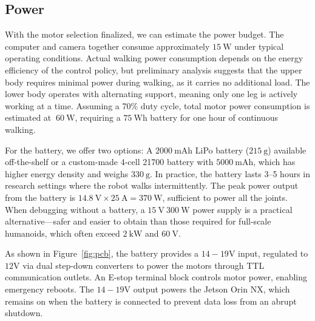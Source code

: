 \subsection{Power}
\label{sec:power_budget}





With the motor selection finalized, we can estimate the power budget. The computer and camera together consume approximately $15~\mathrm{W}$ under typical operating conditions. Actual walking power consumption depends on the energy efficiency of the control policy, but preliminary analysis suggests that the upper body requires minimal power during walking, as it carries no additional load. The lower body operates with alternating support, meaning only one leg is actively working at a time. Assuming a 70\% duty cycle, total motor power consumption is estimated at $~60~\mathrm{W}$, requiring a $75~\mathrm{Wh}$ battery for one hour of continuous walking.

For the battery, we offer two options: A $2000~\mathrm{mAh}$ LiPo battery ($215~\mathrm{g}$) available off-the-shelf or a custom-made 4-cell 21700 battery with $5000~\mathrm{mAh}$, which has higher energy density and weighs $330~\mathrm{g}$.
In practice, the battery lasts 3–5 hours in research settings where the robot walks intermittently. The peak power output from the battery is $14.8~\mathrm{V} \times 25~\mathrm{A} = 370~\mathrm{W}$, sufficient to power all the joints. When debugging without a battery, a $15~\mathrm{V}~300~\mathrm{W}$ power supply is a practical alternative—safer and easier to obtain than those required for full-scale humanoids, which often exceed $2~\mathrm{kW}$ and $60~\mathrm{V}$.

As shown in Figure~\ref{fig:pcb}, the battery provides a $14-19\mathrm{V}$ input, regulated to $12\mathrm{V}$ via dual step-down converters to power the motors through TTL communication outlets. An E-stop terminal block controls motor power, enabling emergency reboots. The $14-19\mathrm{V}$ output powers the Jetson Orin NX, which remains on when the battery is connected to prevent data loss from an abrupt shutdown.



